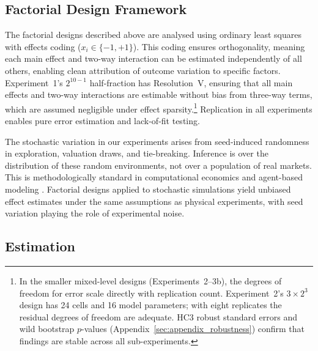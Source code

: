 \subsection{Factorial Design Framework}

The factorial designs described above are analysed using ordinary least squares with effects coding ($x_i \in \{-1, +1\}$). This coding ensures orthogonality, meaning each main effect and two-way interaction can be estimated independently of all others, enabling clean attribution of outcome variation to specific factors. Experiment~1's $2^{10-1}$ half-fraction has Resolution~V, ensuring that all main effects and two-way interactions are estimable without bias from three-way terms, which are assumed negligible under effect sparsity.\footnote{In the smaller mixed-level designs (Experiments~2--3b), the degrees of freedom for error scale directly with replication count. Experiment~2's $3 \times 2^3$ design has 24 cells and 16 model parameters; with eight replicates the residual degrees of freedom are adequate. HC3 robust standard errors and wild bootstrap $p$-values (Appendix~\ref{sec:appendix_robustness}) confirm that findings are stable across all sub-experiments.} Replication in all experiments enables pure error estimation and lack-of-fit testing.

The stochastic variation in our experiments arises from seed-induced randomness in exploration, valuation draws, and tie-breaking. Inference is over the distribution of these random environments, not over a population of real markets. This is methodologically standard in computational economics and agent-based modeling \citep{Tesfatsion2006}. Factorial designs applied to stochastic simulations yield unbiased effect estimates under the same assumptions as physical experiments, with seed variation playing the role of experimental noise.

\subsection{Estimation}

